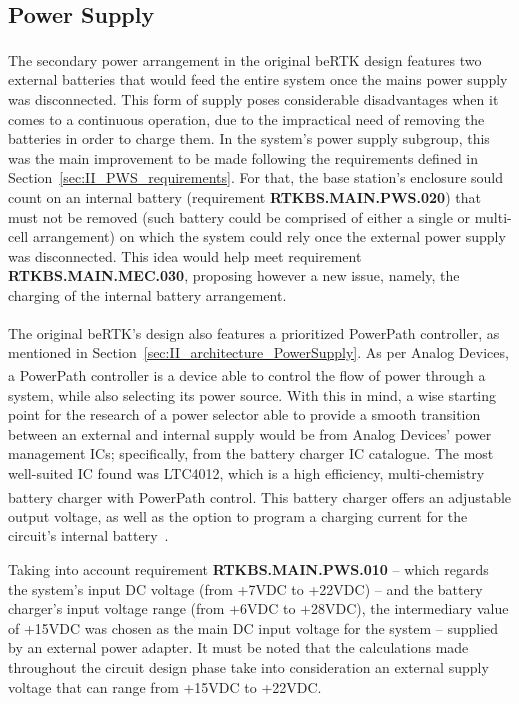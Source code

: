 \subsection{Power Supply}\label{sec:313_PowerSupply}

The secondary power arrangement in the original beRTK\textsuperscript{\textregistered} design features two external batteries that would feed the entire system once the mains power supply was disconnected. This form of supply poses considerable disadvantages when it comes to a continuous operation, due to the impractical need of removing the batteries in order to charge them. In the system's power supply subgroup, this was the main improvement to be made following the requirements defined in Section~\ref{sec:II_PWS_requirements}. For that, the base station's enclosure sould count on an internal battery (requirement \textbf{RTKBS.MAIN.PWS.020}) that must not be removed (such battery could be comprised of either a single or multi-cell arrangement) on which the system could rely once the external power supply was disconnected. This idea would help meet requirement \textbf{RTKBS.MAIN.MEC.030}, proposing however a new issue, namely, the charging of the internal battery arrangement.

The original beRTK\textsuperscript{\textregistered}'s design also features a prioritized PowerPath\textsuperscript{\texttrademark} controller, as mentioned in Section~\ref{sec:II_architecture_PowerSupply}.
As per Analog Devices, a PowerPath\textsuperscript{\texttrademark} controller is a device able to control the flow of power through a system, while also selecting its power source.
With this in mind, a wise starting point for the research of a power selector able to provide a smooth transition between an external and internal supply would be from Analog Devices' power management ICs; specifically, from the battery charger IC catalogue. The most well-suited IC found was LTC4012, which is a high efficiency, multi-chemistry battery charger with PowerPath\textsuperscript{\texttrademark} control. This battery charger offers an adjustable output voltage, as well as the option to program a charging current for the circuit's internal battery~\cite{LTC4012}.

Taking into account requirement \textbf{RTKBS.MAIN.PWS.010} -- which regards the system's input \gls{DC} voltage (from +7VDC to +22VDC) -- and the battery charger's input voltage range (from +6VDC to +28VDC), the intermediary value of +15VDC was chosen as the main DC input voltage for the system -- supplied by an external power adapter. It must be noted that the calculations made throughout the circuit design phase take into consideration an external supply voltage that can range from +15VDC to +22VDC.

